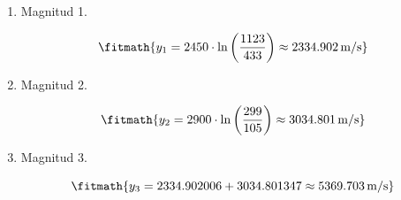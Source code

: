 \begin{enumerate}

\item Magnitud 1.

\[\fitmath{y_{1}=2450\cdot \ln\left(\frac{1123}{433}\right)\approx 2334.902\,\mathrm{m/s}}\]

\item Magnitud 2.

\[\fitmath{y_{2}=2900\cdot \ln\left(\frac{299}{105}\right)\approx 3034.801\,\mathrm{m/s}}\]

\item Magnitud 3.

\[\fitmath{y_{3}=2334.902006+3034.801347\approx 5369.703\,\mathrm{m/s}}\]

\end{enumerate}
